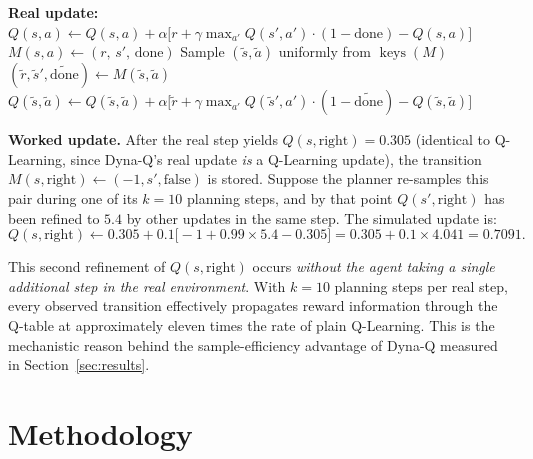 \documentclass[11pt]{article}
\begin{document}
\begin{algorithm}[H]
\caption{Dyna-Q update (replaces the single update in Q-Learning)}
\begin{algorithmic}[1]
    \State \textbf{Real update:}
           $Q(s,a) \leftarrow Q(s,a) +
           \alpha\bigl[r + \gamma \max_{a'} Q(s',a') \cdot (1-\text{done})
           - Q(s,a)\bigr]$
    \State $M(s,a) \leftarrow (r,\, s',\, \text{done})$
           \hfill{}
           \hfill{}
        \State Sample $(\tilde{s}, \tilde{a})$ uniformly from $\operatorname{keys}(M)$
        \State $(\tilde{r}, \tilde{s}', \widetilde{\text{done}}) \leftarrow
               M(\tilde{s}, \tilde{a})$
        \State $Q(\tilde{s},\tilde{a}) \leftarrow Q(\tilde{s},\tilde{a}) +
               \alpha\bigl[\tilde{r} + \gamma \max_{a'} Q(\tilde{s}',a') \cdot
               (1-\widetilde{\text{done}}) - Q(\tilde{s},\tilde{a})\bigr]$
    \EndFor
\EndProcedure
\end{algorithmic}
\end{algorithm}

\textbf{Worked update.} After the real step yields
$Q(s, \text{right}) = 0.305$ (identical to Q-Learning, since Dyna-Q's
real update \emph{is} a Q-Learning update), the transition
$M(s, \text{right}) \leftarrow (-1, s', \text{false})$ is stored.
Suppose the planner re-samples this pair during one of its $k=10$
planning steps, and by that point $Q(s', \text{right})$ has been refined
to $5.4$ by other updates in the same step. The simulated update is:
\[
    Q(s, \text{right}) \leftarrow
    0.305 + 0.1\bigl[-1 + 0.99 \times 5.4 - 0.305\bigr]
    = 0.305 + 0.1 \times 4.041 = 0.7091.
\]

This second refinement of $Q(s, \text{right})$ occurs \emph{without the
agent taking a single additional step in the real environment}. With
$k = 10$ planning steps per real step, every observed transition
effectively propagates reward information through the Q-table at
approximately eleven times the rate of plain Q-Learning. This is the
mechanistic reason behind the sample-efficiency advantage of Dyna-Q
measured in Section~\ref{sec:results}.

\section{Methodology}
\end{document}

